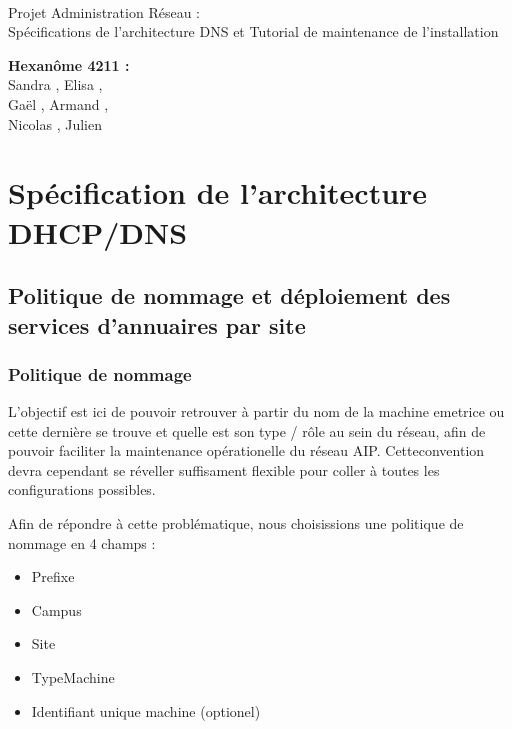 \documentclass[a4paper]{article}
\begin{document}
\begin{titlepage}
	~ 
	\vfill
	\begin{center}
		\begin{Huge}
			Projet Administration Réseau : \\ Spécifications de l'architecture DNS et Tutorial de maintenance de l'installation\\
		\end{Huge}
	\vfill
		\textbf{Hexanôme 4211 :} 
			\\Sandra {}, Elisa , 
			\\Gaël , Armand , 
			\\Nicolas {}, Julien \\
	\vfill
	\end{center}
	\vfill
\end{titlepage}

\newpage
\tableofcontents
\newpage

\section{Spécification de l'architecture DHCP/DNS}

\subsection{Politique de nommage et déploiement des services d'annuaires par site}

\subsubsection{Politique de nommage}

L'objectif est ici de pouvoir retrouver à partir du nom de la machine emetrice ou cette dernière se trouve et quelle est son type / rôle au sein du réseau, afin de pouvoir faciliter la maintenance opérationelle du réseau AIP. Cetteconvention devra cependant se réveller suffisament flexible pour coller à toutes les configurations possibles.

Afin de répondre à cette problématique, nous choisissions une politique de nommage en 4 champs : 

\begin{itemize}
\item Prefixe
\item Campus
\item Site
\item TypeMachine
\item Identifiant unique machine (optionel)
\end{itemize}
\end{document}
